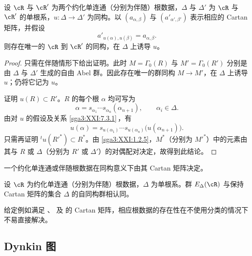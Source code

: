 \begin{proposition}\label{sga3:XXI:7.3.2}
设 \(\cR\) 与 \(\cR'\) 为两个约化单连通（分别为伴随）根数据，\(\Delta\) 与 \(\Delta'\) 为 \(\cR\) 与 \(\cR'\) 的单根系，\(u:\Delta\to\Delta'\) 为同构。以 \((a_{\alpha,\beta})\) 与 \((a'_{\alpha',\beta'})\) 表示相应的 Cartan 矩阵，并假设
\[
 a'_{u(\alpha),u(\beta)}=a_{\alpha,\beta}.
\]
则存在唯一的 \(\cR\) 到 \(\cR'\) 的同构，在 \(\Delta\) 上诱导 \(u\)。
\end{proposition}

\begin{proof}
只需在伴随情形下给出证明。此时 \(M=\Gamma_0(R)\) 与 \(M'=\Gamma_0(R')\) 分别是由 \(\Delta\) 与 \(\Delta'\) 生成的自由 Abel 群。因此存在唯一的群同构 \(M\to M'\)，在 \(\Delta\) 上诱导 \(u\)；仍将它记为 \(u\)。

证明 \(u(R)\subset R'\)。\(R\) 的每个根 \(\alpha\) 均可写为
\[
 \alpha=s_{\alpha_1}\cdots s_{\alpha_n}(\alpha_{n+1}),
 \qquad \alpha_i\in\Delta.
\]
由对 \(u\) 的假设及关系 \ref{sga3:XXI:7.3.1}\,，有
\[
 u(\alpha)=
 s_{u(\alpha_1)}\cdots s_{u(\alpha_n)}
 \bigl(u(\alpha_{n+1})\bigr).
\]
只需再证明 \({}^tu(R'^\ast)\subset R^\ast\)。由 \ref{sga3:XXI:1.2.5}，\(M^\ast\)（分别为 \(M'^\ast\)）中的元素由其与 \(R\) 或 \(\Delta\)（分别为 \(R'\) 或 \(\Delta'\)）的对偶配对决定，故得到此结论。
\end{proof}

\begin{corollary}\label{sga3:XXI:7.3.3}
一个约化单连通或伴随根数据在同构意义下由其 Cartan 矩阵决定。
\end{corollary}

\begin{corollary}\label{sga3:XXI:7.3.4}
设 \(\cR\) 为约化单连通（分别为伴随）根数据，\(\Delta\) 为单根系。群 \(E_\Delta(\cR)\) 与保持 Cartan 矩阵的集合 \(\Delta\) 的自同构群相认同。
\end{corollary}

\begin{remark}\label{sga3:XXI:7.3.5}
给定例如满足 、 及  的 Cartan 矩阵，相应根数据的存在性在不使用分类的情况下不易直接解决。
\end{remark}

\subsection{Dynkin 图}\label{sga3:XXI:7.4}

